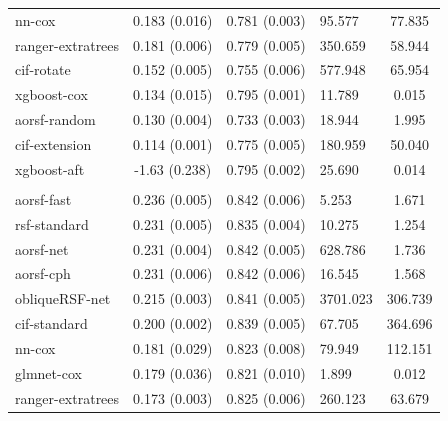 \documentclass[twoside,11pt]{article}\usepackage[]{graphicx}\usepackage[]{xcolor}
\newenvironment{knitrout}{}{} %
\begin{document}
\begin{knitrout}
\begin{longtable}[t]{lcclc}
\hspace{1em}nn-cox & 0.183 (0.016) & 0.781 (0.003) & 95.577 & 77.835\\
\hspace{1em}ranger-extratrees & 0.181 (0.006) & 0.779 (0.005) & 350.659 & 58.944\\
\hspace{1em}cif-rotate & 0.152 (0.005) & 0.755 (0.006) & 577.948 & 65.954\\
\hspace{1em}xgboost-cox & 0.134 (0.015) & 0.795 (0.001) & 11.789 & 0.015\\
\hspace{1em}aorsf-random & 0.130 (0.004) & 0.733 (0.003) & 18.944 & 1.995\\
\hspace{1em}cif-extension & 0.114 (0.001) & 0.775 (0.005) & 180.959 & 50.040\\
\hspace{1em}xgboost-aft & -1.63 (0.238) & 0.795 (0.002) & 25.690 & 0.014\\
\addlinespace[0.3em]
\hline
\multicolumn{5}{l}{\textit{\textbf{ARIC; heart failure, n = 13623, p = 41}}}\\
\hline
\hspace{1em}aorsf-fast & 0.236 (0.005) & 0.842 (0.006) & 5.253 & 1.671\\
\hspace{1em}rsf-standard & 0.231 (0.005) & 0.835 (0.004) & 10.275 & 1.254\\
\hspace{1em}aorsf-net & 0.231 (0.004) & 0.842 (0.005) & 628.786 & 1.736\\
\hspace{1em}aorsf-cph & 0.231 (0.006) & 0.842 (0.006) & 16.545 & 1.568\\
\hspace{1em}obliqueRSF-net & 0.215 (0.003) & 0.841 (0.005) & 3701.023 & 306.739\\
\hspace{1em}cif-standard & 0.200 (0.002) & 0.839 (0.005) & 67.705 & 364.696\\
\hspace{1em}nn-cox & 0.181 (0.029) & 0.823 (0.008) & 79.949 & 112.151\\
\hspace{1em}glmnet-cox & 0.179 (0.036) & 0.821 (0.010) & 1.899 & 0.012\\
\hspace{1em}ranger-extratrees & 0.173 (0.003) & 0.825 (0.006) & 260.123 & 63.679\\

\end{longtable}
\end{knitrout}
\end{document}
